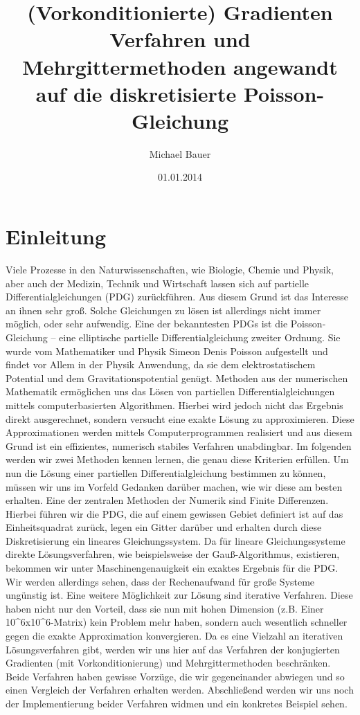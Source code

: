 \documentclass{article}
\title{(Vorkonditionierte) Gradienten Verfahren und Mehrgittermethoden angewandt auf die diskretisierte Poisson-Gleichung}
\author{Michael Bauer}
\date{01.01.2014}
\begin{document}
\maketitle
\newpage
\tableofcontents
\newpage
\large

\section{Einleitung}
Viele Prozesse in den Naturwissenschaften, wie Biologie, Chemie und Physik, aber auch der Medizin, Technik und Wirtschaft lassen sich auf partielle Differentialgleichungen (PDG) zurückführen. Aus diesem Grund ist das Interesse an ihnen sehr groß. Solche Gleichungen zu lösen ist allerdings nicht immer möglich, oder sehr aufwendig.
Eine der bekanntesten PDGs ist die Poisson-Gleichung – eine elliptische partielle Differentialgleichung zweiter Ordnung. Sie wurde vom Mathematiker und Physik Simeon Denis Poisson aufgestellt und findet vor Allem in der Physik Anwendung, da sie dem elektrostatischem Potential und dem Gravitationspotential genügt.
Methoden aus der numerischen Mathematik ermöglichen uns das Lösen von partiellen Differentialgleichungen mittels computerbasierten Algorithmen. Hierbei wird jedoch nicht das Ergebnis direkt ausgerechnet, sondern versucht eine exakte Lösung zu approximieren. Diese Approximationen werden mittels Computerprogrammen realisiert und aus diesem Grund ist ein effizientes, numerisch stabiles Verfahren unabdingbar. Im folgenden werden wir zwei Methoden kennen lernen, die genau diese Kriterien erfüllen.
Um nun die Lösung einer partiellen Differentialgleichung bestimmen zu können, müssen wir uns im Vorfeld Gedanken darüber machen, wie wir diese am besten erhalten. Eine der zentralen Methoden der Numerik sind Finite Differenzen. Hierbei führen wir die PDG, die auf einem gewissen Gebiet definiert ist auf das Einheitsquadrat zurück, legen ein Gitter darüber und erhalten durch diese Diskretisierung ein lineares Gleichungssystem.
Da für lineare Gleichungssysteme direkte Lösungsverfahren, wie beispielsweise der Gauß-Algorithmus, existieren, bekommen wir unter Maschinengenauigkeit ein exaktes Ergebnis für die PDG. Wir werden allerdings sehen, dass der Rechenaufwand für große Systeme ungünstig ist.
Eine weitere Möglichkeit zur Lösung sind iterative Verfahren. Diese haben nicht nur den Vorteil, dass sie nun mit hohen Dimension (z.B. Einer 10^6x10^6-Matrix) kein Problem mehr haben, sondern auch wesentlich schneller gegen die exakte Approximation konvergieren.
Da es eine Vielzahl an iterativen Lösungsverfahren gibt, werden wir uns hier auf das Verfahren der konjugierten Gradienten (mit Vorkonditionierung) und Mehrgittermethoden beschränken. Beide Verfahren haben gewisse Vorzüge, die wir gegeneinander abwiegen und so einen Vergleich der Verfahren erhalten werden. Abschließend werden wir uns noch der Implementierung beider Verfahren widmen und ein konkretes Beispiel sehen.
\end{document}
